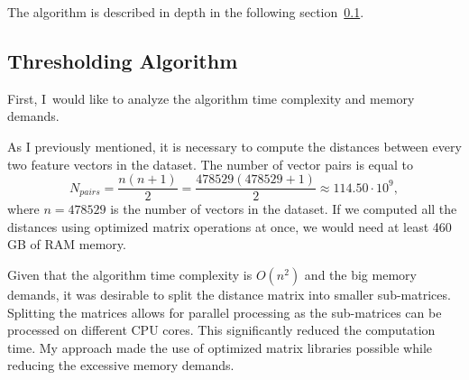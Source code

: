 The algorithm is described in depth in the following section~\ref{subsec:thresholding-algorithm}.

\subsection{Thresholding Algorithm}\label{subsec:thresholding-algorithm}
First, I would like to analyze the algorithm time complexity and memory demands.

As I previously mentioned, it is necessary to compute the distances between every two feature vectors in the dataset.
The number of vector pairs is equal to
\begin{equation}
    N_{pairs} = \frac{n\left(n+1\right)}{2} = \frac{478529\left(478529+1\right)}{2} \approx 114.50 \cdot 10^9,
\end{equation}
where $n = 478529$ is the number of vectors in the dataset.
If we computed all the distances using optimized matrix operations at once, we would need at least 460 GB of RAM memory.

Given that the algorithm time complexity is $O(n^2)$ and the big memory demands, it was desirable to split the distance
matrix into smaller sub-matrices.
Splitting the matrices allows for parallel processing as the sub-matrices can be processed on different CPU cores.
This significantly reduced the computation time.
My approach made the use of optimized matrix libraries possible while reducing the excessive memory demands.


